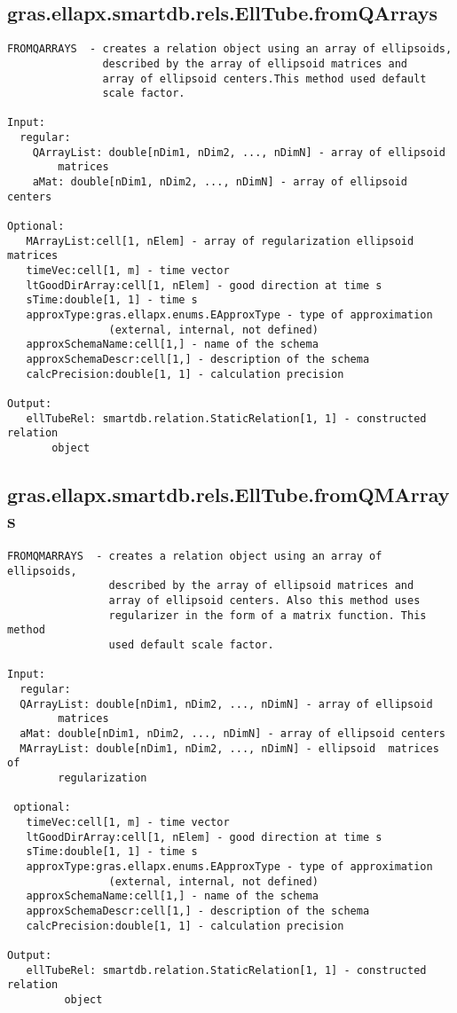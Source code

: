 \subsection{\texorpdfstring{gras.ellapx.smartdb.rels.EllTube.fromQArrays}{fromQArrays}}\label{method:gras.ellapx.smartdb.rels.EllTube.fromQArrays}
\begin{verbatim}
FROMQARRAYS  - creates a relation object using an array of ellipsoids,
               described by the array of ellipsoid matrices and
               array of ellipsoid centers.This method used default
               scale factor.

Input:
  regular:
    QArrayList: double[nDim1, nDim2, ..., nDimN] - array of ellipsoid
        matrices
    aMat: double[nDim1, nDim2, ..., nDimN] - array of ellipsoid centers

Optional:
   MArrayList:cell[1, nElem] - array of regularization ellipsoid matrices
   timeVec:cell[1, m] - time vector
   ltGoodDirArray:cell[1, nElem] - good direction at time s
   sTime:double[1, 1] - time s
   approxType:gras.ellapx.enums.EApproxType - type of approximation
                (external, internal, not defined)
   approxSchemaName:cell[1,] - name of the schema
   approxSchemaDescr:cell[1,] - description of the schema
   calcPrecision:double[1, 1] - calculation precision

Output:
   ellTubeRel: smartdb.relation.StaticRelation[1, 1] - constructed relation
       object
\end{verbatim}
\subsection{\texorpdfstring{gras.ellapx.smartdb.rels.EllTube.fromQMArrays}{fromQMArrays}}\label{method:gras.ellapx.smartdb.rels.EllTube.fromQMArrays}
\begin{verbatim}
FROMQMARRAYS  - creates a relation object using an array of ellipsoids,
                described by the array of ellipsoid matrices and
                array of ellipsoid centers. Also this method uses
                regularizer in the form of a matrix function. This method
                used default scale factor.

Input:
  regular:
  QArrayList: double[nDim1, nDim2, ..., nDimN] - array of ellipsoid
        matrices
  aMat: double[nDim1, nDim2, ..., nDimN] - array of ellipsoid centers
  MArrayList: double[nDim1, nDim2, ..., nDimN] - ellipsoid  matrices of
        regularization

 optional:
   timeVec:cell[1, m] - time vector
   ltGoodDirArray:cell[1, nElem] - good direction at time s
   sTime:double[1, 1] - time s
   approxType:gras.ellapx.enums.EApproxType - type of approximation
                (external, internal, not defined)
   approxSchemaName:cell[1,] - name of the schema
   approxSchemaDescr:cell[1,] - description of the schema
   calcPrecision:double[1, 1] - calculation precision

Output:
   ellTubeRel: smartdb.relation.StaticRelation[1, 1] - constructed relation
         object
\end{verbatim}
